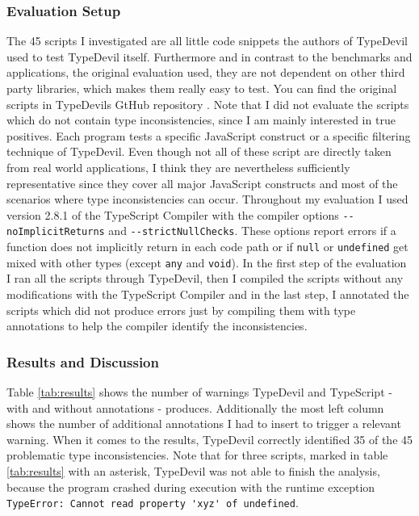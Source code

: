 \documentclass[runningheads,a4paper]{llncs}
\begin{document}
\subsubsection{Evaluation Setup}
The 45 scripts I investigated are all little code snippets the authors of TypeDevil used to test TypeDevil itself. 
Furthermore and in contrast to the benchmarks and applications, the original evaluation used, they are not dependent on other third party libraries, which makes them really easy to test.
You can find the original scripts in TypeDevils GtHub repository \cite{TypeDevilGitHubTests}.
Note that I did not evaluate the scripts which do not contain type inconsistencies, since I am mainly interested in true positives.
Each program tests a specific JavaScript construct or a specific filtering technique of TypeDevil.
Even though not all of these script are directly taken from real world applications, I think they are nevertheless sufficiently representative since they cover all major JavaScript constructs and most of the scenarios where type inconsistencies can occur.
Throughout my evaluation I used version 2.8.1 of the TypeScript Compiler with the compiler options \lstinline[columns=fixed]{--noImplicitReturns} and \lstinline[columns=fixed]{--strictNullChecks}.
These options report errors if a function does not implicitly return in each code path or if \lstinline[columns=fixed]{null} or \lstinline[columns=fixed]{undefined} get mixed with other types (except \lstinline[columns=fixed]{any} and \lstinline[columns=fixed]{void}).
In the first step of the evaluation I ran all the scripts through TypeDevil, then I compiled the scripts without any modifications with the TypeScript Compiler and in the last step, I annotated the scripts which did not produce errors just by compiling them with type annotations to help the compiler identify the inconsistencies.


\subsubsection{Results and Discussion}
Table \ref{tab:results} shows the number of warnings TypeDevil and TypeScript - with and without annotations - produces.
Additionally the most left column shows the number of additional annotations I had to insert to trigger a relevant warning.
When it comes to the results, TypeDevil correctly identified 35 of the 45 problematic type inconsistencies.
Note that for three scripts, marked in table \ref{tab:results} with an asterisk, TypeDevil was not able to finish the analysis, because the program crashed during execution with the runtime exception \lstinline[columns=fixed]{TypeError: Cannot read property 'xyz' of undefined}.
\end{document}
